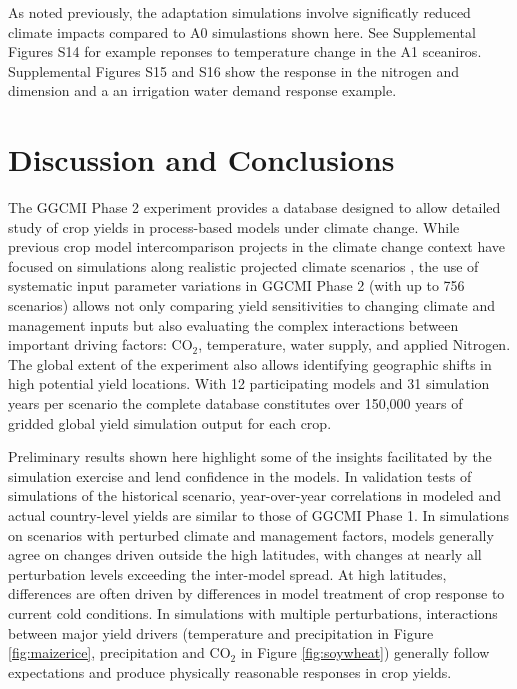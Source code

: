 \documentclass[gmd, manuscript]{copernicus} %
\begin{document}
As noted previously, the adaptation simulations involve significatly reduced climate impacts compared to A0 simulastions shown here. 
See Supplemental Figures S14 for example reponses to temperature change in the A1 sceaniros. 
Supplemental Figures S15 and S16 show the response in the nitrogen and dimension and a an irrigation water demand response example.

\section{Discussion and Conclusions} 
\label{S:5}
The GGCMI Phase 2 experiment provides a database designed to allow detailed study of crop yields in process-based models under climate change. 
While previous crop model intercomparison projects in the climate change context have focused on simulations along realistic projected climate scenarios \citep[e.g.][]{Rosenzweig2014}, the use of systematic input parameter variations in GGCMI Phase 2 (with up to 756 scenarios) allows not only comparing yield sensitivities to changing climate and management inputs but also evaluating the complex interactions between important driving factors: CO$_2$, temperature, water supply, and applied Nitrogen. 
The global extent of the experiment also allows identifying geographic shifts in high potential yield locations. 
With 12 participating models and 31 simulation years per scenario the complete database constitutes over 150,000 years of gridded global yield simulation output for each crop.

Preliminary results shown here highlight some of the insights facilitated by the simulation exercise and lend confidence in the models. 
In validation tests of simulations of the historical scenario, year-over-year correlations in modeled and actual country-level yields are similar to those of GGCMI Phase 1. 
In simulations on scenarios with perturbed climate and management factors, models generally agree on changes driven outside the high latitudes, with changes at nearly all perturbation levels exceeding the inter-model spread. At high latitudes, differences are often driven by differences in model treatment of crop response to current cold conditions. 
In simulations with multiple perturbations, interactions between major yield drivers (temperature and precipitation in Figure \ref{fig:maizerice}, precipitation and CO$_2$ in Figure \ref{fig:soywheat}) generally follow expectations and produce physically reasonable responses in crop yields.
\end{document}

